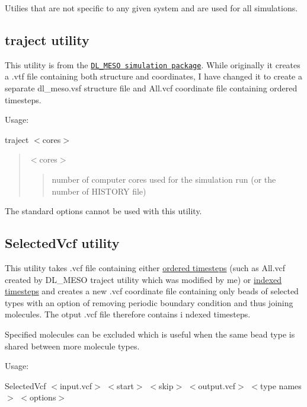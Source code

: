 Utilies that are not specific to any given system and are used for all simulations.\hypertarget{Common_traject}{}\subsection{traject utility}\label{Common_traject}
This utility is from the \href{http://www.scd.stfc.ac.uk//research/app/ccg/software/DL_MESO/40694.aspx}{\tt D\+L\+\_\+\+M\+E\+SO simulation package}. While originally it creates a {\ttfamily .vtf} file containing both structure and coordinates, I have changed it to create a separate {\ttfamily dl\+\_\+meso.\+vsf} structure file and {\ttfamily All.\+vcf} coordinate file containing ordered timesteps.

Usage\+:

{\ttfamily traject $<$cores$>$}

\begin{quote}
{\ttfamily $<$cores$>$} \begin{quote}
number of computer cores used for the simulation run (or the number of {\ttfamily H\+I\+S\+T\+O\+RY} file) \end{quote}
\end{quote}


The standard options cannot be used with this utility.\hypertarget{Common_SelectedVcf}{}\subsection{Selected\+Vcf utility}\label{Common_SelectedVcf}
This utility takes {\ttfamily .vcf} file containing either \hyperlink{InputFiles_OrderedCoorFile}{ordered timesteps} (such as {\ttfamily All.\+vcf} created by D\+L\+\_\+\+M\+E\+SO {\ttfamily traject} utility which was modified by me) or \hyperlink{InputFiles_IndexedCoorFile}{indexed timesteps} and creates a new {\ttfamily .vcf} coordinate file containing only beads of selected types with an option of removing periodic boundary condition and thus joining molecules. The otput {\ttfamily .vcf} file therefore contains i ndexed timesteps.

Specified molecules can be excluded which is useful when the same bead type is shared between more molecule types.

Usage\+:

{\ttfamily Selected\+Vcf $<$input.\+vcf$>$ $<$start$>$ $<$skip$>$ $<$output.\+vcf$>$ $<$type names$>$ $<$options$>$}

